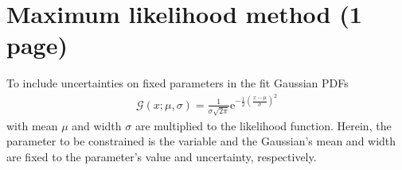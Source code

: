 
\section{Maximum likelihood method (1 page)}
\label{sec:dataanalysis:maximumlikelihood}

To include uncertainties on fixed parameters in the fit Gaussian PDFs
%
\begin{align}
\label{eq:b02dd:decaytimefit:gaussian}
\mathcal{G}(x;\mu,\sigma) = \frac{1}{\sigma \sqrt{2 \pi}}\mathrm{e}^{-\frac{1}{2}\left(\frac{x-\mu}{\sigma}\right)^2}
\end{align}
%
with mean $\mu$ and width $\sigma$ are multiplied to the likelihood function.
Herein, the parameter to be constrained is the variable and the Gaussian's
mean and width are fixed to the parameter's value and uncertainty,
respectively.